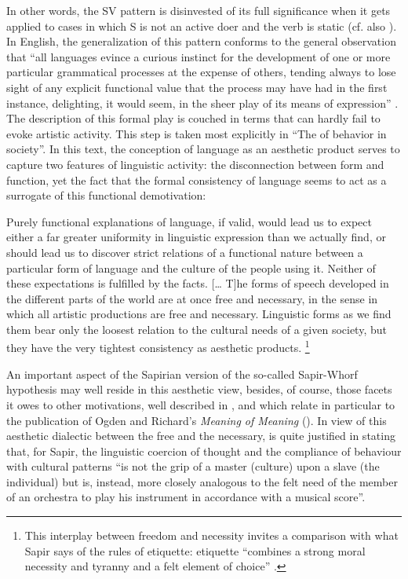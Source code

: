 \documentclass[output=paper]{langscibook}
\begin{document}
In other words, the SV pattern is disinvested of its full significance when it gets applied to cases in which S is not an active doer and the verb is static (cf. also \citealt[14--15]{Sapir1921}). In English, the generalization of this pattern conforms to the general observation that ``all languages evince a curious instinct for the development of one or more particular grammatical processes at the expense of others, tending always to lose sight of any explicit functional value that the process may have had in the first instance, delighting, it would seem, in the sheer play of its means of expression'' \citep[60]{Sapir1921}. The description of this formal play is couched in terms that can hardly fail to evoke artistic activity. This step is taken most explicitly in ``The  of behavior in society''. In this text, the conception of language as an aesthetic product serves to capture two features of linguistic activity: the disconnection between form and function, yet the fact that the formal consistency of language seems to act as a surrogate of this functional demotivation:

\begin{modquote}
Purely functional explanations of language, if valid, would lead us to expect either a far greater uniformity in linguistic expression than we actually find, or should lead us to discover strict relations of a functional nature between a particular form of language and the culture of the people using it. Neither of these expectations is fulfilled by the facts. [… T]he forms of speech developed in the different parts of the world are at once free and necessary, in the sense in which all artistic productions are free and necessary. Linguistic forms as we find them bear only the loosest relation to the cultural needs of a given society, but they have the very tightest consistency as aesthetic products. \citep[550]{Sapir1927b}\footnote{This interplay between freedom and necessity invites a comparison with what Sapir says of the rules of etiquette: etiquette ``combines a strong moral necessity and tyranny and a felt element of choice'' \citep[236]{Sapir2002}.} 
\end{modquote}

An important aspect of the Sapirian version of the so-called Sapir-Whorf hypothesis may well reside in this aesthetic view, besides, of course, those facets it owes to other motivations, well described in \citet{Joseph2002}, and which relate in particular to the publication of Ogden and Richard's \emph{Meaning of Meaning} (\citeyear{Ogden1923}). In view of this aesthetic dialectic between the free and the necessary, \citet[462]{Allen1986} is quite justified in stating that, for Sapir, the linguistic coercion of thought and the compliance of behaviour with cultural patterns ``is not the grip of a master (culture) upon a slave (the individual) but is, instead, more closely analogous to the felt need of the member of an orchestra to play his instrument in accordance with a musical score''.
\end{document}
